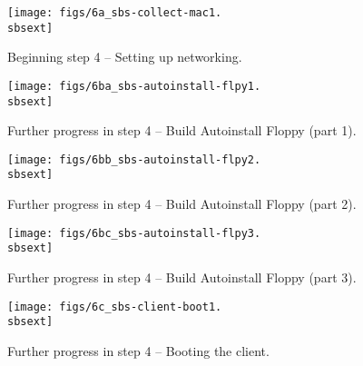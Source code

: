 
\begin{figure}[htbp]
  \begin{center}

    \centerline{\texttt{[image: figs/6a\_sbs-collect-mac1.\\sbsext]}}
    \caption{Beginning step 4 -- Setting up networking.}
    \label{fig:sbs-setup-network1}
  \end{center}
\end{figure}



\begin{figure}[htbp]
  \begin{center}
    \centerline{\texttt{[image: figs/6ba\_sbs-autoinstall-flpy1.\\sbsext]}}
    \caption{Further progress in step 4 -- Build Autoinstall Floppy
      (part 1).} 
    \label{fig:sbs-autoinstall-flpy1}
  \end{center}
\end{figure}

\begin{figure}[htbp]
  \begin{center}
    \centerline{\texttt{[image: figs/6bb\_sbs-autoinstall-flpy2.\\sbsext]}}
    \caption{Further progress in step 4 -- Build Autoinstall Floppy
      (part 2).} 
    \label{fig:sbs-autoinstall-flpy2}
  \end{center}
\end{figure}


\begin{figure}[htbp]
  \begin{center}
    \centerline{\texttt{[image: figs/6bc\_sbs-autoinstall-flpy3.\\sbsext]}}
    \caption{Further progress in step 4 -- Build Autoinstall Floppy
      (part 3).} 
    \label{fig:sbs-autoinstall-flpy3}
  \end{center}
\end{figure}

\begin{figure}[htbp]
  \begin{center}
    \centerline{\texttt{[image: figs/6c\_sbs-client-boot1.\\sbsext]}}
    \caption{Further progress in step 4 -- Booting the client.}
    \label{fig:sbs-collect-boot1}
  \end{center}
\end{figure}

